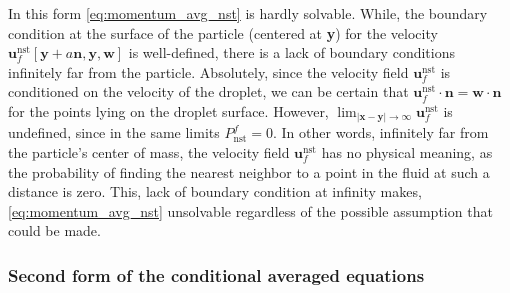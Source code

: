 In this form \ref{eq:momentum_avg_nst} is hardly solvable. 
While, the boundary condition at the surface of the particle (centered at \textbf{y}) for the velocity $\textbf{u}_f^\text{nst}[\textbf{y}+a \textbf{n}, \textbf{y},\textbf{w}]$ is well-defined, there is a lack of boundary conditions infinitely far from the particle. 
Absolutely, since the velocity field $\textbf{u}_f^\text{nst}$ is conditioned on the velocity of the droplet, we can be certain that $\textbf{u}_f^\text{nst}\cdot \textbf{n} = \textbf{w}\cdot \textbf{n}$ for the points lying on the droplet surface. 
However, $\lim_{|\textbf{x}- \textbf{y}|\to \infty} \textbf{u}^\text{nst}_f$ is undefined, since in the same limits $P_\text{nst}^f = 0$.
In other words, infinitely far from the particle's center of mass, the velocity field $\textbf{u}^\text{nst}_f$ has no physical meaning, as the probability of finding the nearest neighbor to a point in the fluid at such a distance is zero.
This, lack of boundary condition at infinity makes, \ref{eq:momentum_avg_nst} unsolvable regardless of the possible assumption that could be made.

\subsubsection{Second form of the conditional averaged equations}

